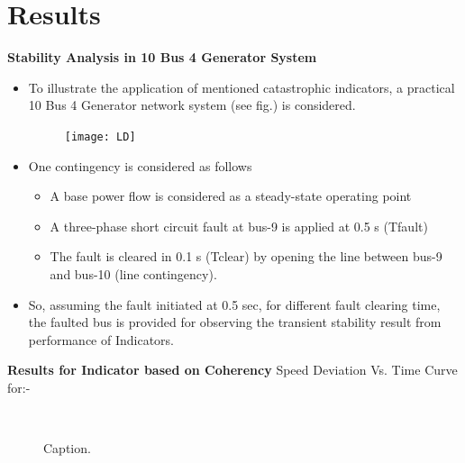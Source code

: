 \documentclass [xcolor=svgnames, t] {beamer}
\begin{document}
	


\section{Results}

\begin{frame}{\textbf{Stability Analysis in 10 Bus 4 Generator System}}
\begin{itemize}
\item To illustrate the application of mentioned catastrophic indicators, a practical 10 Bus 4 Generator network system (see fig.) is considered.
\begin{figure}[H]
  \centering
  \texttt{[image: LD]}
  \end{figure}
\item One contingency is considered as follows
\begin{itemize}
\item A base power flow is considered as a steady-state operating point 
\item A three-phase short circuit fault at bus-9 is applied at 0.5 s (Tfault)
\item The fault is cleared in 0.1 s (Tclear) by
opening the line between bus-9 and bus-10 (line contingency).
\end{itemize}
\item So, assuming the fault initiated at 0.5 sec, for different fault clearing
time, the faulted bus is provided for observing the transient stability result from performance of Indicators.
\end{itemize}

\end{frame}

\begin{frame}{\textbf{Results for Indicator based on Coherency}}
Speed Deviation Vs. Time Curve for:-
\begin{figure}
    \centering
{}
\subfloat[Tclear = 0.1 sec]{
    \texttt{[image: Co A1]}}\\
\subfloat[Tclear = 0.2 sec]{
    \texttt{[image: Co A2]}}
\subfloat[Tclear = 0.3 sec]{
    \texttt{[image: Co A3]}}
\caption{Caption.}
\end{figure}
\end{frame}
\end{document}
